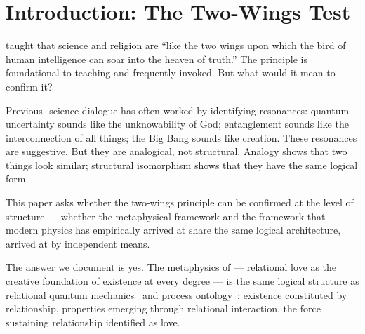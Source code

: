 
\section{Introduction: The Two-Wings Test}
\label{sec:intro}


\AbdulBaha taught that science and religion are ``like the two wings upon which
the bird of human intelligence can soar into the heaven of truth.''
The principle is foundational to \bahai teaching and frequently invoked.
But what would it mean to confirm it?

Previous \bahai-science dialogue has often worked by identifying resonances:
quantum uncertainty sounds like the unknowability of God; entanglement sounds
like the interconnection of all things; the Big Bang sounds like creation.
These resonances are suggestive.
But they are analogical, not structural.
Analogy shows that two things look similar; structural isomorphism shows that
they have the same logical form.

This paper asks whether the two-wings principle can be confirmed at the level
of structure --- whether the \bahai metaphysical framework and the framework
that modern physics has empirically arrived at share the same logical
architecture, arrived at by independent means.

The answer we document is yes.
The \bahai metaphysics of \mahabbat --- relational love as the creative
foundation of existence at every degree --- is the same logical structure
as relational quantum mechanics~\citep{Rovelli1996} and process
ontology~\citep{Whitehead1929}: existence constituted by relationship,
properties emerging through relational interaction, the force sustaining
relationship identified as love.

